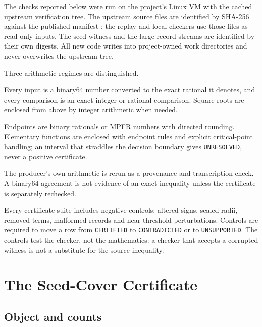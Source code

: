 \documentclass[10pt]{article}
\theoremstyle{definition}
\begin{document}
The checks reported below were run on the project's Linux VM with the cached upstream verification tree. The upstream source files are identified by SHA-256 against the published manifest \cite{source}; the replay and local checkers use those files as read-only inputs. The seed witness and the large record streams are identified by their own digests. All new code writes into project-owned work directories and never overwrites the upstream tree.

Three arithmetic regimes are distinguished.
\begin{description}[leftmargin=1.2em]
\item[Exact rational] Every input is a binary64 number converted to the exact rational it denotes, and every comparison is an exact integer or rational comparison. Square roots are enclosed from above by integer arithmetic when needed.
\item[Outward interval] Endpoints are binary rationals or MPFR numbers with directed rounding. Elementary functions are enclosed with endpoint rules and explicit critical-point handling; an interval that straddles the decision boundary gives \texttt{UNRESOLVED}, never a positive certificate.
\item[Binary64 replay] The producer's own arithmetic is rerun as a provenance and transcription check. A binary64 agreement is not evidence of an exact inequality unless the certificate is separately rechecked.
\end{description}

Every certificate suite includes negative controls: altered signs, scaled radii, removed terms, malformed records and near-threshold perturbations. Controls are required to move a row from \texttt{CERTIFIED} to \texttt{CONTRADICTED} or to \texttt{UNSUPPORTED}. The controls test the checker, not the mathematics: a checker that accepts a corrupted witness is not a substitute for the source inequality.

\section{The Seed-Cover Certificate}
\label{sec:seed}

\subsection{Object and counts}
\end{document}
